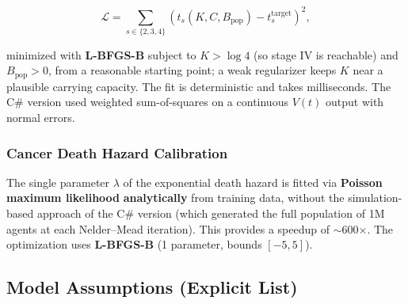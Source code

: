 \documentclass[12pt,a4paper]{article}
\begin{document}
\begin{equation}
    \mathcal{L} = \sum_{s \in \{2,3,4\}} \left( t_s(K, C, B_{\text{pop}}) - t_s^{\text{target}} \right)^2,
\end{equation}

minimized with \textbf{L-BFGS-B} subject to $K > \log 4$ (so stage IV is reachable) and $B_{\text{pop}} > 0$, from a reasonable starting point; a weak regularizer keeps $K$ near a plausible carrying capacity. The fit is deterministic and takes milliseconds. The C\# version used weighted sum-of-squares on a continuous $V(t)$ output with normal errors.

\subsubsection{Cancer Death Hazard Calibration}

The single parameter $\lambda$ of the exponential death hazard is fitted via \textbf{Poisson maximum likelihood} \textbf{analytically} from training data, without the simulation-based approach of the C\# version (which generated the full population of 1M agents at each Nelder--Mead iteration). This provides a speedup of $\sim$600$\times$. The optimization uses \textbf{L-BFGS-B} (1 parameter, bounds $[-5, 5]$).

\subsection{Model Assumptions (Explicit List)}
\end{document}
